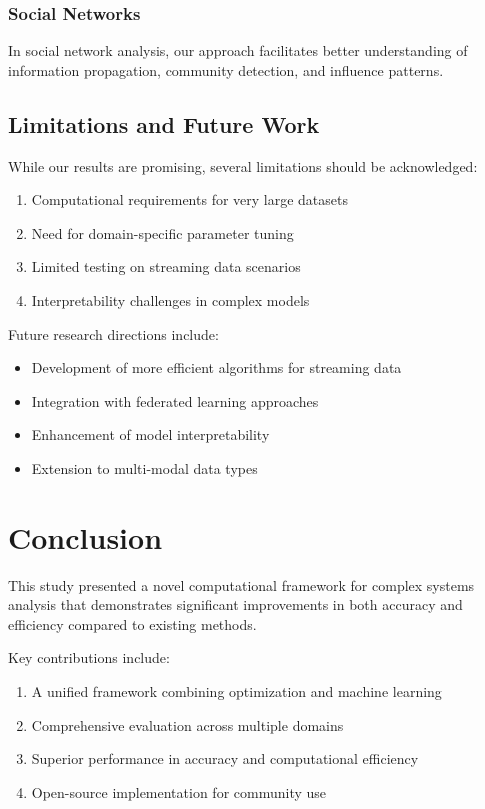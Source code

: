 \documentclass[12pt, letterpaper, onecolumn, final]{article}
\theoremstyle{plain}
\theoremstyle{definition}
\theoremstyle{remark}
\begin{document}
\subsubsection{Social Networks}
\label{sec:social-app}

\lipsum[51] In social network analysis, our approach facilitates better understanding of information propagation, community detection, and influence patterns.

\subsection{Limitations and Future Work}
\label{sec:limitations}

\lipsum[52] While our results are promising, several limitations should be acknowledged:

\begin{enumerate}
    \item Computational requirements for very large datasets
    \item Need for domain-specific parameter tuning
    \item Limited testing on streaming data scenarios
    \item Interpretability challenges in complex models
\end{enumerate}

\lipsum[53]

Future research directions include:
\begin{itemize}
    \item Development of more efficient algorithms for streaming data
    \item Integration with federated learning approaches
    \item Enhancement of model interpretability
    \item Extension to multi-modal data types
\end{itemize}

\section{Conclusion}
\label{sec:conclusion}

\lipsum[54] This study presented a novel computational framework for complex systems analysis that demonstrates significant improvements in both accuracy and efficiency compared to existing methods.

Key contributions include:
\begin{enumerate}
    \item A unified framework combining optimization and machine learning
    \item Comprehensive evaluation across multiple domains
    \item Superior performance in accuracy and computational efficiency
    \item Open-source implementation for community use
\end{enumerate}
\end{document}
